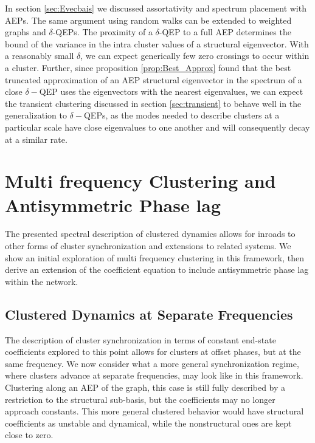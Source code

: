 \documentclass[%
 aip,
 amsmath,amssymb,
preprint,
reprint, onecolumn %
]{revtex4-1}
\begin{document}
In section \ref{sec:Evecbais} we discussed assortativity and spectrum placement with AEPs. The same argument using random walks can be extended to weighted graphs and $\delta$-QEPs.\cite{saade_spectral_nodate} The proximity of a $\delta$-QEP to a full AEP determines the bound of the variance in the intra cluster values of a structural eigenvector. With a reasonably small $\delta$, we can expect generically few zero crossings to occur within a cluster. Further, since proposition \ref{prop:Best_Approx} found that the best truncated approximation of an AEP structural eigenvector in the spectrum of a close $\delta-$QEP uses the eigenvectors with the nearest eigenvalues, we can expect the transient clustering discussed in section \ref{sec:transient} to behave well in the generalization to $\delta-$QEPs, as the modes needed to describe clusters at a particular scale have close eigenvalues to one another and will consequently decay at a similar rate. 



\section{Multi frequency Clustering and Antisymmetric Phase lag}

The presented spectral description of clustered dynamics allows for inroads to other forms of cluster synchronization and extensions to related systems. We show an initial exploration of multi frequency clustering in this framework, then derive an extension of the coefficient equation to include antisymmetric phase lag within the network. 

\subsection{Clustered Dynamics at Separate Frequencies}

The description of cluster synchronization in terms of constant end-state coefficients explored to this point allows for clusters at offset phases, but at the same frequency. We now consider what a more general synchronization regime, where clusters advance at separate frequencies, may look like in this framework. Clustering along an AEP of the graph, this case is still fully described by a restriction to the structural sub-basis, but the coefficients may no longer approach constants. This more general clustered behavior would have structural coefficients as unstable and dynamical, while the nonstructural ones are kept close to zero.
\end{document}
